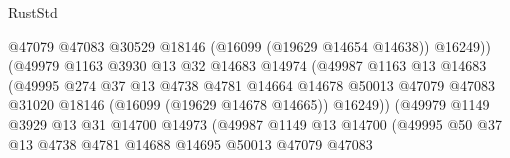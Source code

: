 \begin{lexlean}{RustStd}
\begin{coremodule}
                                        @47079
                                        @47083
                                        @30529
                                        @18146
                                        (@16099 (@19629 @14654 @14638))
                                        @16249))
                                    (@49979
                                      @1163
                                      @3930
                                      @13
                                      @32
                                      @14683
                                      @14974
                                      (@49987
                                        @1163
                                        @13
                                        @14683
                                        (@49995
                                          @274
                                          @37
                                          @13
                                          @4738
                                          @4781
                                          @14664
                                          @14678
                                          @50013
                                          @47079
                                          @47083
                                          @31020
                                          @18146
                                          (@16099 (@19629 @14678 @14665))
                                          @16249))
                                      (@49979
                                        @1149
                                        @3929
                                        @13
                                        @31
                                        @14700
                                        @14973
                                        (@49987
                                          @1149
                                          @13
                                          @14700
                                          (@49995
                                            @50
                                            @37
                                            @13
                                            @4738
                                            @4781
                                            @14688
                                            @14695
                                            @50013
                                            @47079
                                            @47083

\end{coremodule}
\end{lexlean}
